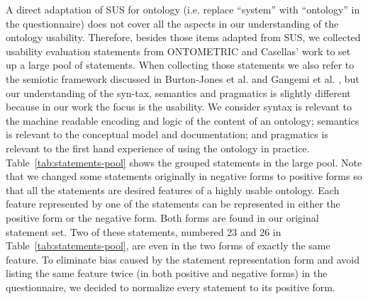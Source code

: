 A direct adaptation of SUS for ontology (i.e. replace ``system'' with ``ontology'' in the questionnaire) does not cover all the aspects in our understanding of the ontology usability. Therefore, besides those items adapted from SUS, we collected usability evaluation statements from ONTOMETRIC \cite{lozano2004ontometric} and Casellas' work \cite{casellas2009ontology} to set up a large pool of statements. When collecting those statements we also refer to the semiotic framework discussed in Burton-Jones et al. \cite{burton2005semiotic} and Gangemi et al. \cite{gangemi2006qood}, but our understanding of the syn-tax, semantics and pragmatics is slightly different because in our work the focus is the usability. We consider syntax is relevant to the machine readable encoding and logic of the content of an ontology; semantics is relevant to the conceptual model and documentation; and pragmatics is relevant to the first hand experience of using the ontology in practice. Table~\ref{tab:statements-pool} shows the grouped statements in the large pool. Note that we changed some statements originally in negative forms to positive forms so that all the statements are desired features of a highly usable ontology. Each feature represented by one of the statements can be represented in either the positive form or the negative form. Both forms are found in our original statement set. Two of these statements, numbered 23 and 26 in Table~\ref{tab:statements-pool}, are even in the two forms of exactly the same feature. To eliminate bias caused by the statement representation form and avoid listing the same feature twice (in both positive and negative forms) in the questionnaire, we decided to normalize every statement to its positive form.

